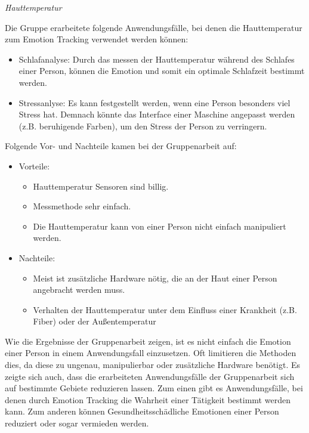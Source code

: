 \vspace{2mm}
\textit{Hauttemperatur}\newline

Die Gruppe erarbeitete folgende Anwendungsfälle, bei denen die Hauttemperatur zum Emotion Tracking verwendet werden können:
\begin{itemize}
	\item Schlafanalyse: Durch das messen der Hauttemperatur während des Schlafes einer Person, können die Emotion  und somit ein optimale Schlafzeit bestimmt werden.
	\item Stressanlyse: Es kann festgestellt werden, wenn eine Person besonders viel Stress hat. Demnach könnte das Interface einer Maschine angepasst werden (z.B. beruhigende Farben), um den Stress der Person zu verringern.
\end{itemize}
Folgende Vor- und Nachteile kamen bei der Gruppenarbeit auf:
\begin{itemize}
	\item Vorteile:
	\begin{itemize}
		\item Hauttemperatur Sensoren sind billig.
		\item Messmethode sehr einfach.	 
		\item Die Hauttemperatur kann von einer Person nicht einfach manipuliert werden.
	\end{itemize}
	\item Nachteile:
	\begin{itemize}
		\item Meist ist zusätzliche Hardware nötig, die an der Haut einer Person angebracht werden muss.
		\item Verhalten der Hauttemperatur unter dem Einfluss einer Krankheit (z.B. Fiber) oder der Außentemperatur
	\end{itemize}
\end{itemize}

Wie die Ergebnisse der Gruppenarbeit zeigen, ist es nicht einfach die Emotion einer Person in einem Anwendungsfall einzusetzen. Oft limitieren die Methoden dies, da diese zu ungenau, manipulierbar oder zusätzliche Hardware benötigt. Es zeigte sich auch, dass die erarbeiteten Anwendungsfälle der Gruppenarbeit sich auf bestimmte Gebiete reduzieren lassen. Zum einen gibt es Anwendungsfälle, bei denen durch Emotion Tracking die Wahrheit einer Tätigkeit bestimmt werden kann. Zum anderen können Gesundheitsschädliche Emotionen einer Person reduziert oder sogar vermieden werden. 

